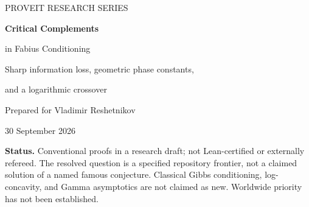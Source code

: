 \documentclass[11pt,a4paper]{article}
\numberwithin{equation}{section}
\theoremstyle{definition}
\theoremstyle{remark}
\begin{document}
\hypersetup{pageanchor=false}
\begin{titlepage}
\vspace*{7mm}
{\large\sffamily\color{ink} PROVEIT RESEARCH SERIES\par}
\vspace{13mm}
{\Huge\bfseries Critical Complements\par
in Fabius Conditioning\par}
\vspace{7mm}
{\Large Sharp information loss, geometric phase constants,\par
and a logarithmic crossover\par}
\vspace{10mm}
{\normalsize Prepared for Vladimir Reshetnikov\par
30 September 2026\par}
\vspace{11mm}
\begin{abstract}
Let $S_q=\sum_{j\ge1}q^jU_j$, with independent uniform coordinates and
$0<q<1$. Condition the original law on $S_q$ lying below its mean under a
large exponential tilt. The repository's earlier conditioning papers
identify when a coordinate block resembles its tilted product law, but
leave the critical-complement regime without sharp rates. We resolve its
geometric-prefix version: observe $n-m$ bulk coordinates, where $n$ is
the effective dimension and $m=o(n)$.

For fixed $m$, the overlap with the tilted product is
$[\tfrac12\log(2\pi n)+1+K_{q,\rho,m}]/\sqrt{2\pi n}
+o(n^{-1/2})$, with an explicit geometric-phase constant. Relative entropy
is $\tfrac12\log(2\pi n)-h(R_m+E)+O(n^{-1})$, and we calculate its
$1/n$ coefficient. An exact compact boundary correction explains the
slow convergence of the overlap expansion.

For $m\to\infty$, $m=o(n)$, relative entropy becomes
$\tfrac12\log(n/m)-\tfrac12+o(1)$. Total variation has a different,
three-regime structure. Its overlap crosses from $\log n/\sqrt n$ to
$\sqrt{(m/n)\log(n/m)}$ at $m\asymp\log n$. We give one leading formula
throughout, using the two real branches of Lambert $W$ and the Gamma
rate function. The information discarded by a fixed complement is
exactly an exponential-noise mutual information in the limit.

Proofs use an exact one-dimensional likelihood identity and a signed
Gamma-convolution calculus, not an unquantified Gaussian extrapolation.
The package includes reproducible floating-point diagnostics and a
further-research program.
\end{abstract}
\vfill
\noindent\small
\textbf{Status.} Conventional proofs in a research draft; not Lean-certified
or externally refereed. The resolved question is a specified repository
frontier, not a claimed solution of a named famous conjecture. Classical
Gibbs conditioning, log-concavity, and Gamma asymptotics are not claimed
as new. Worldwide priority has not been established.
\end{titlepage}
\hypersetup{pageanchor=true}
\tableofcontents
\clearpage
{}
\end{document}
